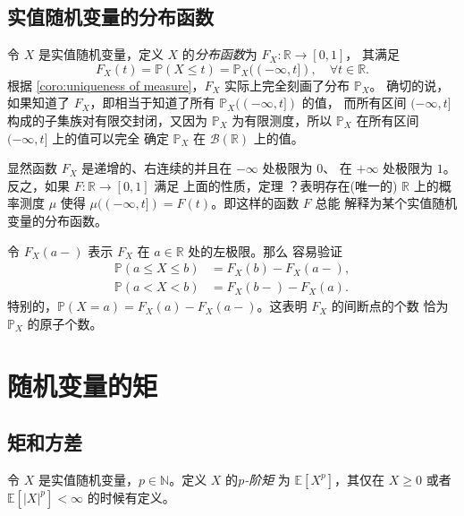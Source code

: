 \documentclass[fontset=none]{Notes}
\begin{document}
\subsection{实值随机变量的分布函数}

令 $X$ 是实值随机变量，定义 $X$ 的\emph{分布函数}为 $F_X:\mathbb{R}\to [0,1]$，
其满足
\[
  F_X(t)=\mathbb{P}(X\leq t)=\mathbb{P}_X((-\infty,t]),\quad \forall t\in \mathbb{R}.  
\]
根据 \autoref{coro:uniqueness of measure}，$F_X$ 实际上完全刻画了分布 $\mathbb{P}_X$。
确切的说，如果知道了 $F_X$，即相当于知道了所有 $\mathbb{P}_X((-\infty,t])$ 的值，
而所有区间 $(-\infty,t]$ 构成的子集族对有限交封闭，又因为 $\mathbb{P}_X$
为有限测度，所以 $\mathbb{P}_X$ 在所有区间 $(-\infty,t]$ 上的值可以完全
确定 $\mathbb{P}_X$ 在 $\mathcal{B}(\mathbb{R})$ 上的值。

显然函数 $F_X$ 是递增的、右连续的并且在 $-\infty$ 处极限为 $0$、
在 $+\infty$ 处极限为 $1$。反之，如果 $F:\mathbb{R}\to [0,1]$ 满足
上面的性质，定理 ？表明存在(唯一的) $\mathbb{R}$ 上的概率测度
$\mu$ 使得 $\mu((-\infty,t])=F(t)$。即这样的函数 $F$ 总能
解释为某个实值随机变量的分布函数。

令 $F_X(a-)$ 表示 $F_X$ 在 $a\in \mathbb{R}$ 处的左极限。那么
容易验证
\begin{align*}
  \mathbb{P}(a\leq X\leq b)&=F_X(b)-F_X(a-),\\
  \mathbb{P}(a<X<b)&=F_X(b-)-F_X(a).
\end{align*}
特别的，$\mathbb{P}(X=a)=F_X(a)-F_X(a-)$。这表明 $F_X$ 的间断点的个数
恰为 $\mathbb{P}_X$ 的原子个数。


\section{随机变量的矩}

\subsection{矩和方差}

令 $X$ 是实值随机变量，$p\in \mathbb{N}$。定义 $X$ 的\emph{$p$-阶矩}
为 $\mathbb{E}[X^p]$，其仅在 $X\geq 0$ 或者 $\mathbb{E}[|X|^p]<\infty$
的时候有定义。
\end{document}

